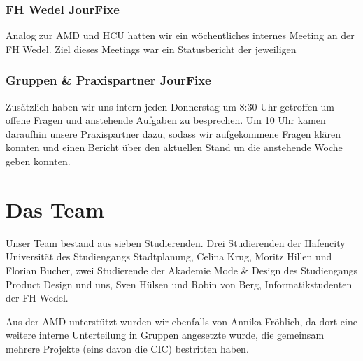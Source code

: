     \subsubsection{FH Wedel JourFixe}
        
        Analog zur AMD und HCU hatten wir ein wöchentliches internes Meeting an der FH Wedel.
        Ziel dieses Meetings war ein Statusbericht der jeweiligen 


    \subsubsection{Gruppen \& Praxispartner JourFixe}
        
        Zusätzlich haben wir uns intern jeden Donnerstag um 8:30 Uhr getroffen um offene Fragen und anstehende Aufgaben zu besprechen.
        Um 10 Uhr kamen daraufhin unsere Praxispartner dazu, sodass wir aufgekommene Fragen klären konnten und einen Bericht über den aktuellen Stand un die anstehende Woche geben konnten.



\section{Das Team}

        Unser Team bestand aus sieben Studierenden. Drei Studierenden der Hafencity Universität des Studiengangs Stadtplanung, Celina Krug, Moritz Hillen und Florian Bucher, zwei Studierende der Akademie Mode \& Design des Studiengangs Product Design und uns, Sven Hülsen und Robin von Berg, Informatikstudenten der FH Wedel.

        Aus der AMD unterstützt wurden wir ebenfalls von Annika Fröhlich, da dort eine weitere interne Unterteilung in Gruppen angesetzte wurde, die gemeinsam mehrere Projekte (eins davon die CIC) bestritten haben.

